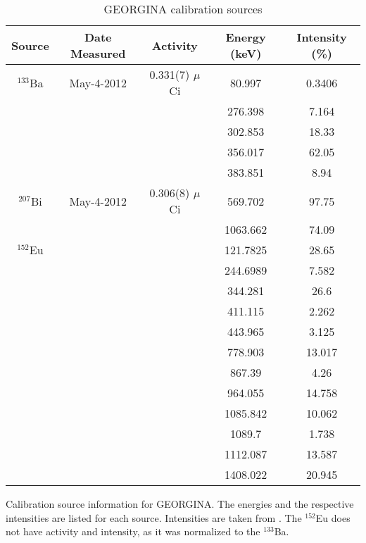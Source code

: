 \begin{table}[]
    \centering
    \small
    \caption{GEORGINA calibration sources}
    \begin{tabular}{c|c|c|c|c} \toprule
         Source & Date Measured & Activity & Energy (keV) & Intensity (\%)\\
          \hline 
         $^{133}$Ba & May-4-2012 & 0.331(7) $\mu$Ci & 80.997 & 0.3406 \\
         & & & 276.398 & 7.164 \\
         & & & 302.853 & 18.33 \\
         & & & 356.017 & 62.05 \\
         & & & 383.851 & 8.94 \\
         \hline
         $^{207}$Bi & May-4-2012 & 0.306(8) $\mu$Ci & 569.702 & 97.75 \\ 
         & & & 1063.662 & 74.09 \\
         \hline
         $^{152}$Eu & & & 121.7825 & 28.65 \\
         & & & 244.6989 & 7.582 \\
         & & & 344.281 & 26.6 \\
         & & & 411.115 & 2.262 \\
         & & & 443.965 & 3.125 \\
         & & & 778.903 & 13.017 \\
         & & & 867.39 & 4.26 \\
         & & & 964.055 & 14.758 \\
         & & & 1085.842 & 10.062 \\
         & & & 1089.7 & 1.738 \\
         & & & 1112.087 & 13.587 \\
         & & & 1408.022 & 20.945 \\\bottomrule
    \end{tabular}
    \footnotesize
    \item Calibration source information for GEORGINA. The energies and the respective intensities are listed for each source. Intensities are taken from \cite{trzaska90:_calibration}. The  $^{152}$Eu does not have activity and intensity, as it was normalized to the $^{133}$Ba.
    \label{tab:GEORGINA_Cal_Source}
\end{table}